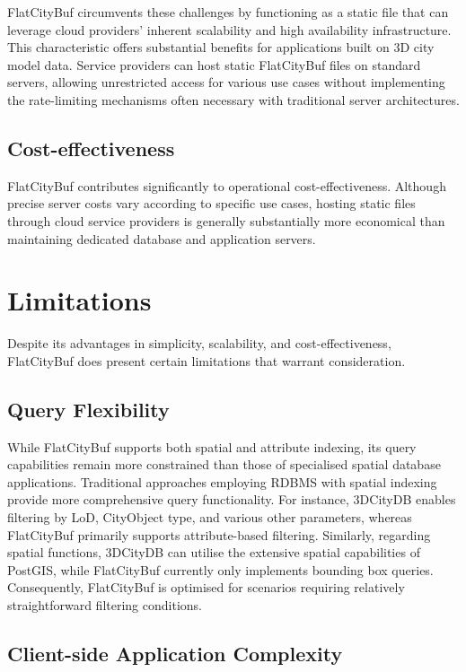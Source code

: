 FlatCityBuf circumvents these challenges by functioning as a static file that can leverage cloud providers' inherent scalability and high availability infrastructure. This characteristic offers substantial benefits for applications built on 3D city model data. Service providers can host static FlatCityBuf files on standard servers, allowing unrestricted access for various use cases without implementing the rate-limiting mechanisms often necessary with traditional server architectures.

\subsection{Cost-effectiveness}
\label{cost_effectiveness}

FlatCityBuf contributes significantly to operational cost-effectiveness. Although precise server costs vary according to specific use cases, hosting static files through cloud service providers is generally substantially more economical than maintaining dedicated database and application servers.

\section{Limitations}
\label{limitations}

Despite its advantages in simplicity, scalability, and cost-effectiveness, FlatCityBuf does present certain limitations that warrant consideration.

\subsection{Query Flexibility}
\label{flexibility_of_query}

While FlatCityBuf supports both spatial and attribute indexing, its query capabilities remain more constrained than those of specialised spatial database applications. Traditional approaches employing RDBMS with spatial indexing provide more comprehensive query functionality. For instance, 3DCityDB enables filtering by LoD, CityObject type, and various other parameters, whereas FlatCityBuf primarily supports attribute-based filtering. Similarly, regarding spatial functions, 3DCityDB can utilise the extensive spatial capabilities of PostGIS, while FlatCityBuf currently only implements bounding box queries. Consequently, FlatCityBuf is optimised for scenarios requiring relatively straightforward filtering conditions.

\subsection{Client-side Application Complexity}
\label{complexity_of_client_side_application}

